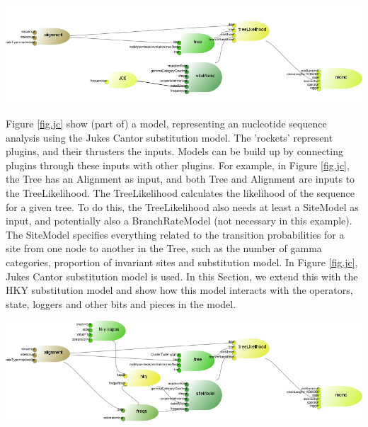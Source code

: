 \documentclass{article}
\begin{document}
\includegraphics[width=\textwidth]{example1.png}
\rm\\\hskip10pt

Figure \ref{fig.jc} show (part of) a model, representing an nucleotide sequence analysis 
using the Jukes Cantor substitution model. The 'rockets' represent plugins, and their
thrusters the inputs. Models can be build up by connecting plugins through these inputs
with other plugins. For example, in Figure \ref{fig.jc}, the Tree has an Alignment
as input, and both Tree and Alignment are inputs to the TreeLikelihood. The TreeLikelihood
calculates the likelihood of the sequence for a given tree. To do this, the TreeLikelihood
also needs at least a SiteModel as input, and potentially also a BranchRateModel (not
necessary in this example). The SiteModel specifies everything related to the transition
probabilities for a site from one node to another in the Tree, such as the number of
gamma categories, proportion of invariant sites and substitution model. In Figure \ref{fig.jc},
Jukes Cantor substitution model is used. In this Section,  we extend this with the 
HKY substitution model and show how this model interacts with the operators,
state, loggers and other bits and pieces in the model.


\includegraphics[width=\textwidth]{example2.png}
\rm\\\hskip10pt
\end{document}

